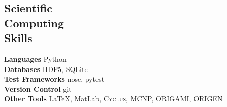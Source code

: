 \documentclass[margin,line]{resume}
\newcommand{\Cyclus}{\textsc{Cyclus}\xspace}%
\begin{document}
\begin{resume}
    \section{\mysidestyle Scientific\\Computing\\Skills}
                \textbf{Languages} \hfill Python\vspace{.5mm}\\%
                \textbf{Databases} \hfill HDF5, SQLite\vspace{.5mm}\\%
                \textbf{Test Frameworks} \hfill nose, pytest\vspace{.5mm}\\%
                \textbf{Version Control} \hfill git\vspace{.5mm}\\%
                \textbf{Other Tools} \hfill \LaTeX, MatLab, \Cyclus, MCNP, ORIGAMI, ORIGEN\vspace{.5mm}%

\end{resume}
\end{document}
